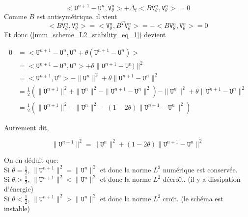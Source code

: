 \documentclass[12pt,a4paper]{article}
\numberwithin{equation}{section}
\begin{document}
\begin{equation}
    <\texttt{U}^{n+1}- \texttt{U}^n, \texttt{V}^n_\theta >+ \Delta_t < B\texttt{V}^n_\theta , \texttt{V}^n_\theta  > = 0 \label{num_scheme_L2_stability_eq_1}
\end{equation}
Comme $B$ est antisymétrique, il vient 
$$< B\texttt{V}^n_\theta , \texttt{V}^n_\theta  > = < \texttt{V}^n_\theta , B^T\texttt{V}^n_\theta  > = -< B\texttt{V}^n_\theta , \texttt{V}^n_\theta  > = 0$$
Et donc (\ref{num_scheme_L2_stability_eq_1}) devient

\begin{equation}\label{develop_theta_square}
\begin{split}
    0  &=   <\texttt{U}^{n+1}- \texttt{U}^n, \texttt{U}^{n} + \theta(\texttt{U}^{n+1}  - \texttt{U}^{n})> 
    \\ &=   <\texttt{U}^{n+1}- \texttt{U}^n, \texttt{U}^{n}>  + \theta\|\texttt{U}^{n+1}  - \texttt{U}^{n})\|^2
    \\ &=   <\texttt{U}^{n+1}, \texttt{U}^{n}>-  \|\texttt{U}^{n}\|^2 + \theta\|\texttt{U}^{n+1}  - \texttt{U}^{n}\|^2
    \\ &=   \frac{1}{2}\left(\|\texttt{U}^{n+1}\|^2+ \|\texttt{U}^n\|^2 - \|\texttt{U}^{n+1}- \texttt{U}^n\|^2\right)-  \|\texttt{U}^{n}\|^2 + \theta\|\texttt{U}^{n+1}  - \texttt{U}^{n}\|^2
    \\ &=   \frac{1}{2}\left(\|\texttt{U}^{n+1}\|^2 - \|\texttt{U}^n\|^2 - (1 - 2\theta) \|\texttt{U}^{n+1}-  \texttt{U}^{n}\|^2 \right)
\end{split}
\end{equation}

Autrement dit, 

\begin{equation}
    \|\texttt{U}^{n+1}\|^2 = \|\texttt{U}^n\|^2 + (1 - 2\theta) \|\texttt{U}^{n+1}-  \texttt{U}^{n}\|^2
\end{equation}

On en déduit que:\\

Si $\theta = \frac{1}{2}$, $\|\texttt{U}^{n+1}\|^2 = \|\texttt{U}^n\|^2$ et donc la norme $L^2$ numérique est conservée.\\

Si $\theta > \frac{1}{2}$, $\|\texttt{U}^{n+1}\|^2 < \|\texttt{U}^n\|^2$ et donc la norme $L^2$ décroît. (il y a dissipation d'énergie)\\

Si $\theta < \frac{1}{2}$, $\|\texttt{U}^{n+1}\|^2 > \|\texttt{U}^n\|^2$ et donc la norme $L^2$ croît. (le schéma est instable)\\
\end{document}
